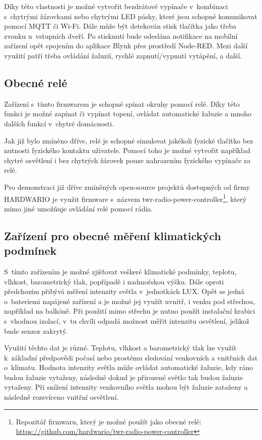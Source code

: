 Díky této vlastnosti je možné vytvořit bezdrátové vypínače v~kombinaci s~chytrými žárovkami nebo chytrými LED pásky, které jsou schopné komunikovat pomocí MQTT či Wi-Fi.
Dále může být detekován stisk tlačítka jako třeba zvonku u~vstupních dveří. Po stisknutí bude odeslána notifikace na mobilní zařízení opět spojením do aplikace Blynk přes prostředí Node-RED. 
Mezi další využití patří třeba ovládání žaluzií, rychlé zapnutí/vypnutí vytápění, a další.

\subsection*{Obecné relé}
Zařízení s~tímto firmwarem je schopné spínat okruhy pomocí relé. Díky této funkci je možné zapínat či vypínat topení, ovládat automatické žaluzie a mnoho dalších funkcí v~chytré domácnosti. 

Jak již bylo zmíněno dříve, relé je schopné simulovat jakékoli fyzické tlačítko bez nutnosti fyzického kontaktu uživatele. Pomocí toho je možné vytvořit například chytré osvětlení i bez chytrých žárovek pouze nahrazením fyzického vypínače za relé.

Pro demonstraci již dříve zmíněných open-source projektů dostupných od firmy HARDWARIO je využit firmware s~názvem twr-radio-power-controller\footnote{Repozitář firmwaru, který je možné použít jako obecné relé: \url{https://github.com/hardwario/twr-radio-power-controller}}, který mimo jiné umožňuje ovládání relé pomocí rádia.

\subsection*{Zařízení pro obecné měření klimatických podmínek}
S~tímto zařízením je možné zjišťovat veškeré klimatické podmínky, teplotu, vlhkost, barometrický tlak, popřípadě i nadmořskou výšku. Dále oproti předchozím přibývá měření intenzity světla v~jednotkách LUX. 
Opět se jedná o~bateriemi napájené zařízení a je možné jej využít uvnitř, i venku pod střechou, například na balkóně. Při použití mimo střechu je nutno použít instalační krabici s~vhodnou izolací, v~tu chvíli odpadá možnost měřit intenzitu osvětlení, jelikož bude senzor zakrytý.

Využití těchto dat je různé. Teplotu, vlhkost a barometrický tlak lze využít k~základní předpovědi počasí nebo prostému sledování venkovních a vnitřních dat o~klimatu. 
Hodnota intenzity světla může ovládat automatické žaluzie, kdy ráno budou žaluzie vytaženy, následně dokud je přirozené světlo tak budou žaluzie vytaženy. Při snížení intenzity venkovního světla mohou být žaluzie zataženy a následně rozsvíceno vnitřní osvětlení.

